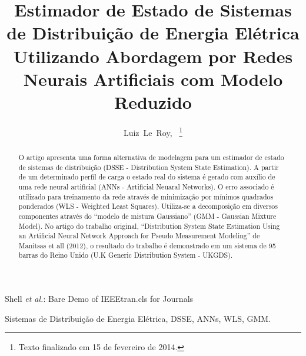 \documentclass[journal]{IEEEtran}
\begin{document}
%
\title{Estimador de Estado de Sistemas de Distribuição de Energia Elétrica Utilizando Abordagem por Redes Neurais Artificiais com Modelo Reduzido}
%
%
%

\author{Luiz~Le~Roy,~
\thanks{Texto finalizado em 15 de fevereiro de 2014.}}

%
{Shell \MakeLowercase{\textit{et al.}}: Bare Demo of IEEEtran.cls for Journals}

\maketitle

\begin{abstract}
O artigo apresenta uma forma alternativa de modelagem para um estimador de estado de sistemas de distribuição (DSSE - Distribution System State Estimation). A partir de um determinado perfil de carga o estado real do sistema é gerado com auxílio de uma rede neural artificial (ANNs - Artificial Neuaral Networks).
O erro associado é utilizado para treinamento da rede através de minimização por mínimos quadrados ponderados (WLS - Weighted Least Squares). Utiliza-se a decomposição em diversos componentes através do ``modelo de mistura Gaussiano'' (GMM - Gaussian Mixture Model). No artigo do trabalho original, ``Distribution System State Estimation Using an Artificial Neural Network Approach for Pseudo Measurement Modeling'' de Manitsas et all (2012), o resultado do trabalho é demonstrado em um sistema de 95 barras do Reino Unido (U.K Generic Distribution System - UKGDS).
\end{abstract}

\begin{IEEEkeywords}
Sistemas de Distribuição de Energia Elétrica, DSSE, ANNs, WLS, GMM.
\end{IEEEkeywords}
\end{document}
